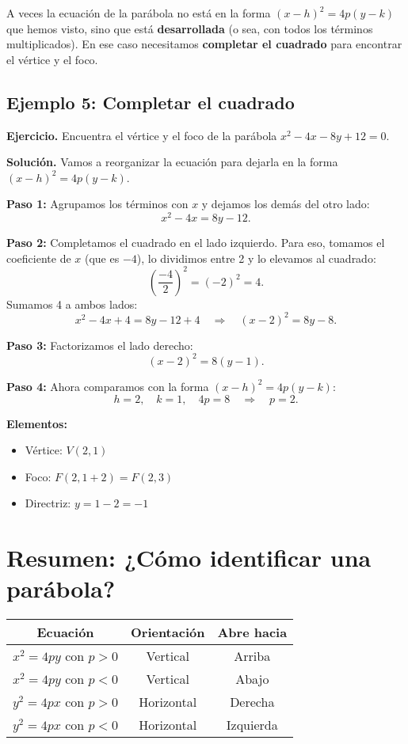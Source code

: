 \documentclass[12pt,a4paper]{article}
\begin{document}
	A veces la ecuación de la parábola no está en la forma \((x-h)^2=4p(y-k)\) que hemos visto, sino que está \textbf{desarrollada} (o sea, con todos los términos multiplicados). En ese caso necesitamos \textbf{completar el cuadrado} para encontrar el vértice y el foco.

	\subsection*{Ejemplo 5: Completar el cuadrado}

	\textbf{Ejercicio.} Encuentra el vértice y el foco de la parábola \(x^2-4x-8y+12=0\).

	\bigskip

	\textbf{Solución.} Vamos a reorganizar la ecuación para dejarla en la forma \((x-h)^2=4p(y-k)\).

	\bigskip

	\textbf{Paso 1:} Agrupamos los términos con \(x\) y dejamos los demás del otro lado:
	\[
	x^2-4x=8y-12.
	\]

	\textbf{Paso 2:} Completamos el cuadrado en el lado izquierdo. Para eso, tomamos el coeficiente de \(x\) (que es \(-4\)), lo dividimos entre 2 y lo elevamos al cuadrado:
	\[
	\left(\frac{-4}{2}\right)^2=(-2)^2=4.
	\]
	Sumamos 4 a ambos lados:
	\[
	x^2-4x+4=8y-12+4 \quad\Rightarrow\quad (x-2)^2=8y-8.
	\]

	\textbf{Paso 3:} Factorizamos el lado derecho:
	\[
	(x-2)^2=8(y-1).
	\]

	\textbf{Paso 4:} Ahora comparamos con la forma \((x-h)^2=4p(y-k)\):
	\[
	h=2,\quad k=1,\quad 4p=8 \quad\Rightarrow\quad p=2.
	\]

	\bigskip

	\textbf{Elementos:}
	\begin{itemize}
		\item Vértice: \(V(2,1)\)
		\item Foco: \(F(2,1+2)=F(2,3)\)
		\item Directriz: \(y=1-2=-1\)
	\end{itemize}

	\section{Resumen: ¿Cómo identificar una parábola?}

	\begin{center}
		\begin{tabular}{|c|c|c|}
			\hline
			\textbf{Ecuación} & \textbf{Orientación} & \textbf{Abre hacia} \\
			\hline
			\(x^2=4py\) con \(p>0\) & Vertical & Arriba \\
			\hline
			\(x^2=4py\) con \(p<0\) & Vertical & Abajo \\
			\hline
			\(y^2=4px\) con \(p>0\) & Horizontal & Derecha \\
			\hline
			\(y^2=4px\) con \(p<0\) & Horizontal & Izquierda \\
			\hline
		\end{tabular}
	\end{center}
\end{document}
